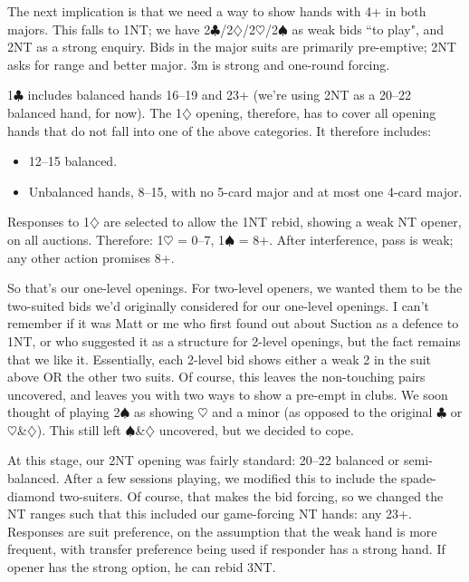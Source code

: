 \documentclass[a4paper,12pt]{article}
\begin{document}
The next implication is that we need a way to show hands with 4+ in both
majors.  This falls to 1NT; we have 2$\clubsuit$/2$\diamondsuit$/2$\heartsuit$/2$\spadesuit$ as weak bids ``to play", and 2NT
as a strong enquiry.  Bids in the major suits are primarily pre-emptive; 2NT
asks for range and better major.  3m is strong and one-round forcing.

1$\clubsuit$ includes balanced hands 16--19 and 23+ (we're using 2NT as a 20--22 balanced
hand, for now).  The 1$\diamondsuit$ opening, therefore, has to cover all opening hands that
do not fall into one of the above categories.  It therefore includes:

\begin{itemize}
\item 12--15 balanced.
\item Unbalanced hands, 8--15, with no 5-card major and at most one 4-card
      major.
\end{itemize}

Responses to 1$\diamondsuit$ are selected to allow the 1NT rebid, showing a weak NT opener,
on all auctions.  Therefore: 1$\heartsuit$ = 0--7, 1$\spadesuit$ = 8+.  After interference, pass is
weak; any other action promises 8+.

So that's our one-level openings.  For two-level openers, we wanted them to be
the two-suited bids we'd originally considered for our one-level openings.  I
can't remember if it was Matt or me who first found out about Suction as a
defence to 1NT, or who suggested it as a structure for 2-level openings, but
the fact remains that we like it.  Essentially, each 2-level bid shows either a
weak 2 in the suit above OR the other two suits.  Of course, this leaves the
non-touching pairs uncovered, and leaves you with two ways to show a pre-empt
in clubs.  We soon thought of playing 2$\spadesuit$ as showing $\heartsuit$ and a minor (as opposed
to the original $\clubsuit$ or $\heartsuit$\&$\diamondsuit$).  This still left $\spadesuit$\&$\diamondsuit$ uncovered, but we decided to
cope.

At this stage, our 2NT opening was fairly standard: 20--22 balanced or
semi-balanced.  After a few sessions playing, we modified this to include the
spade-diamond two-suiters.  Of course, that makes the bid forcing, so we
changed the NT ranges such that this included our game-forcing NT hands: any
23+.  Responses are suit preference, on the assumption that the weak hand is
more frequent, with transfer preference being used if responder has a strong
hand.  If opener has the strong option, he can rebid 3NT.
\end{document}
